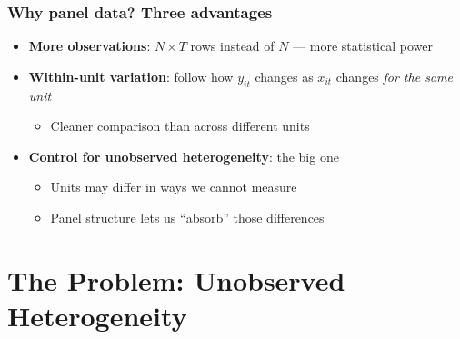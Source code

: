 \begin{frame}
\frametitle{Why panel data? Three advantages}
\centering

\begin{itemize}[<+->]
\item \textbf{More observations}: $N \times T$ rows instead of $N$ --- more statistical power
\vspace{8pt}
\item \textbf{Within-unit variation}: follow how $y_{it}$ changes as $x_{it}$ changes \emph{for the same unit}
  \begin{itemize}
  \item Cleaner comparison than across different units
  \end{itemize}
\vspace{8pt}
\item \textbf{Control for unobserved heterogeneity}: the big one
  \begin{itemize}
  \item Units may differ in ways we cannot measure
  \item Panel structure lets us ``absorb'' those differences
  \end{itemize}
\end{itemize}

\end{frame}

\section{The Problem: Unobserved Heterogeneity}

